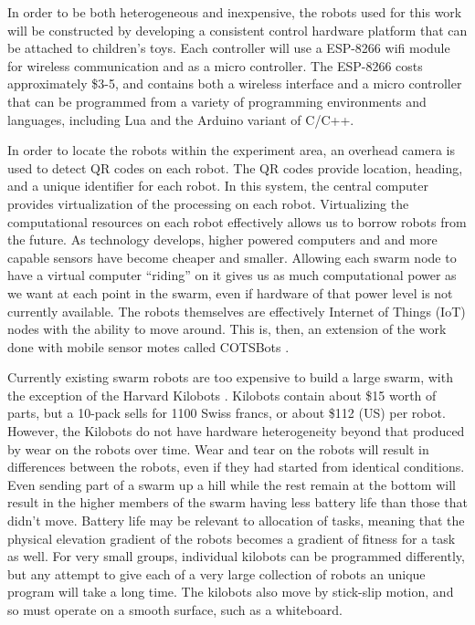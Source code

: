 \documentclass[]{article}
\begin{document}
In order to be both heterogeneous and inexpensive, the robots used for this work will be constructed by developing a consistent control hardware platform that can be attached to children's toys. 
Each controller will use a ESP-8266 wifi module for wireless communication and as a micro controller. 
The ESP-8266 costs approximately \$3-5, and contains both a wireless interface and a micro controller that can be programmed from a variety of programming environments and languages, including Lua and the Arduino variant of C/C++. 

In order to locate the robots within the experiment area, an overhead camera is used to detect QR codes on each robot. 
The QR codes provide location, heading, and a unique identifier for each robot. 
In this system, the central computer provides virtualization of the processing on each robot. 
Virtualizing the computational resources on each robot effectively allows us to borrow robots from the future. 
As technology develops, higher powered computers and and more capable sensors have become cheaper and smaller. 
Allowing each swarm node to have a virtual computer ``riding'' on it gives us as much computational power as we want at each point in the swarm, even if hardware of that power level is not currently available.
The robots themselves are effectively Internet of Things (IoT) nodes with the ability to move around. 
This is, then, an extension of the work done with mobile sensor motes called COTSBots \cite{bergbreiter2003cotsbots}.

Currently existing swarm robots are too expensive to build a large swarm, with the exception of the Harvard Kilobots \cite{rubenstein2014kilobot}. 
Kilobots contain about \$15 worth of parts, but a 10-pack sells for 1100 Swiss francs, or about \$112 (US) per robot. 
However, the Kilobots do not have hardware heterogeneity beyond that produced by wear on the robots over time. 
Wear and tear on the robots will result in differences between the robots, even if they had started from identical conditions. 
Even sending part of a swarm up a hill while the rest remain at the bottom will result in the higher members of the swarm having less battery life than those that didn't move. 
Battery life may be relevant to allocation of tasks, meaning that the physical elevation gradient of the robots becomes a gradient of fitness for a task as well. 
For very small groups, individual kilobots can be programmed differently, but any attempt to give each of a very large collection of robots an unique program will take a long time. 
The kilobots also move by stick-slip motion, and so must operate on a smooth surface, such as a whiteboard. 
\end{document}
